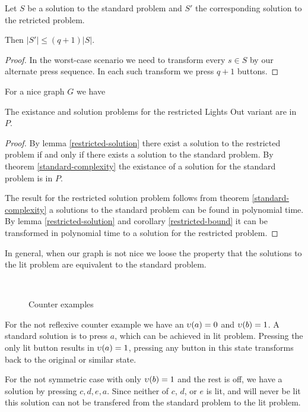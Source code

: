 \begin{corollary}\label{restricted-bound}
    Let $S$ be a solution to the standard problem and $S'$ the corresponding solution to the retricted problem.

    Then $|S'|\leq(q+1)|S|$.
\end{corollary}

\begin{proof}
    In the worst-case scenario we need to transform every $s\in S$ by our alternate press sequence. In each such transform we press $q+1$ buttons. 
\end{proof}

\begin{theorem}
    For a nice graph $G$ we have

    The existance and solution problems for the restricted Lights Out variant are in $P$.
\end{theorem}

\begin{proof}
    By lemma \ref{restricted-solution} there exist a solution to the restricted problem if and only if there exists a solution to the standard problem.
    By theorem \ref{standard-complexity} the existance of a solution for the standard problem is in $P$.

    The result for the restricted solution problem follows from theorem \ref{standard-complexity} a solutions to the standard problem can be found in polynomial time.
    By lemma \ref{restricted-solution} and corollary \ref{restricted-bound} it can be transformed in polynomial time to a solution for the restricted problem.
\end{proof}

In general, when our graph is not nice we loose the property that the solutions to the lit problem are equivalent to the standard problem.

\begin{figure}\label{figure:not-nice-counter-examples}
  \mbox{
    \label{counter-example:not-reflexive}
    \label{counter-example:not-symmetric}
    \label{counter-example:not-same-weight}
   }
  \caption{Counter examples}
\end{figure}

\begin{remark}
    For the not reflexive counter example we have an $\upsilon(a) = 0$ and $\upsilon(b) = 1$. A standard solution is to press $a$, which can be achieved in lit problem.
    Pressing the only lit button results in $\upsilon(a) = 1$, pressing any button in this state transforms back to the original or similar state.

    For the not symmetric case with only $\upsilon(b) = 1$ and the rest is off, we have a solution by pressing $c, d, e, a$. Since neither of $c$, $d$, or $e$ is lit, and will never be lit this solution can not be transfered from the standard problem to the lit problem.
\end{remark}